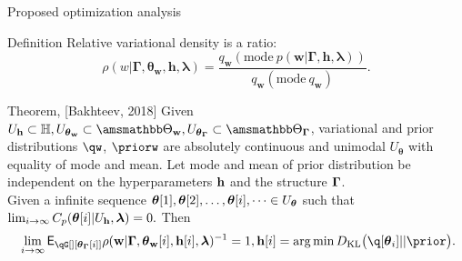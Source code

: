 \documentclass[usenames,dvipsnames,11pt,pdf,utf8,russian,aspectratio=43]{beamer}
\DeclareMathOperator*{\argmin}{arg\,min}
\begin{document}
\begin{frame}{Proposed optimization analysis}
\vspace{-0.2cm} 
\begin{block}{Definition}
Relative variational density is a ratio:
\[
\rho(w|\boldsymbol{\Gamma},\boldsymbol{\theta}_\mathbf{w}, \mathbf{h},\boldsymbol{\lambda})=\frac{q_\mathbf{w}(\text{mode}~p(\mathbf{w}|\boldsymbol{\Gamma}, \mathbf{h}, \boldsymbol{\lambda}))}{q_\mathbf{w}(\text{mode}~{q_\mathbf{w}})}.
\]
\end{block}
\vspace{-0.2cm} 
\begin{block}{Theorem, [Bakhteev, 2018]}
Given $\Uh \subset \Hb, \Utetaw \subset \Tetawb, \UtetaG \subset \TetaGb$,
variational and prior distributions $\qw$, $\priorw$ are absolutely continuous and unimodal  $U_{\boldsymbol{\theta}}$  with equality of mode and mean.
Let mode and mean of prior distribution be independent on the hyperparameters $\mathbf{h}$ and the structure $\boldsymbol{\Gamma}$.\\
Given a infinite sequence $\boldsymbol{\theta}[1],\boldsymbol{\theta}[2],\dots,\boldsymbol{\theta}[i],\dots \in U_{\boldsymbol{\theta}}$ such that $\lim_{i \to \infty}C_p(\boldsymbol{\theta}[i]|U_{\mathbf{h}},\boldsymbol{\lambda}) = 0.$
Then
\footnotesize
$$
   \lim_{i \to \infty} \E_{\qG[][{\tetaG[i]}]} {\rho}(\w|\Gam, {\tetaw[i]}, {\h[i]}, \lam)^{-1} = 1, \h[i] = \argmin \KL{\q[\teta_i]}{\prior}.
$$
\end{block}


\end{frame}
\end{document}
